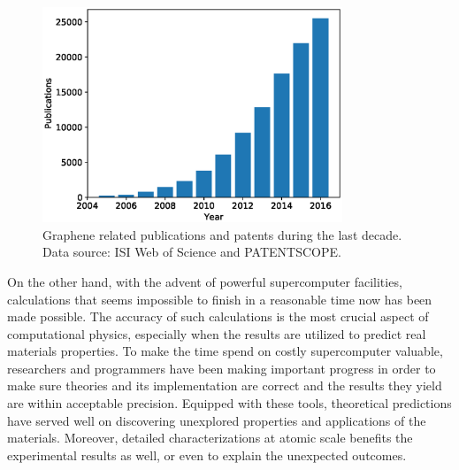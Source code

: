 \begin{figure}[htbp!] 
\centering  
\includegraphics[width=0.8\textwidth]{graphene_papers.eps}
\caption[Graphene publications]{Graphene related publications and patents during the last decade. Data source: ISI Web of Science and PATENTSCOPE. \protect\footnotemark }  
\label{fig:grpapers}
\end{figure} 

On the other hand, with the advent of powerful supercomputer facilities, calculations that seems impossible to finish in a reasonable time now has been made possible. The accuracy of such calculations is the most crucial aspect of computational physics, especially when the results are utilized to predict real materials properties. To make the time spend on costly supercomputer valuable, researchers and programmers have been making important progress in order to make sure theories and its implementation are correct and the results they yield are within acceptable precision. Equipped with these tools, theoretical predictions have served well on discovering unexplored properties and applications of the materials. Moreover, detailed characterizations at atomic scale benefits the experimental results as well, or even to explain the unexpected outcomes.


